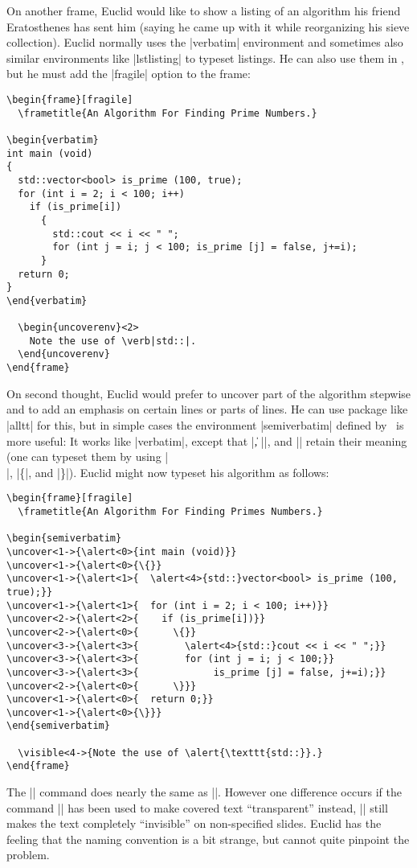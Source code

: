 On another frame, Euclid would like to show a listing of an algorithm his friend Eratosthenes has sent him (saying he came up with it while reorganizing his sieve collection). Euclid normally uses the |verbatim| environment and sometimes also similar environments like |lstlisting| to typeset listings. He can also use them in \beamer, but he must add the |fragile| option to the frame:
\begin{Verbatim}
\begin{frame}[fragile]
  \frametitle{An Algorithm For Finding Prime Numbers.}

\begin{verbatim}
int main (void)
{
  std::vector<bool> is_prime (100, true);
  for (int i = 2; i < 100; i++)
    if (is_prime[i])
      {
        std::cout << i << " ";
        for (int j = i; j < 100; is_prime [j] = false, j+=i);
      }
  return 0;
}
\end{verbatim}

  \begin{uncoverenv}<2>
    Note the use of \verb|std::|.
  \end{uncoverenv}
\end{frame}
\end{Verbatim}

On second thought, Euclid would prefer to uncover part of the algorithm stepwise and to add an emphasis on certain lines or parts of lines. He can use package like |alltt| for this, but in simple cases the environment |{semiverbatim}| defined by \beamer\ is more useful: It works like |{verbatim}|, except that |\|, |{|, and |}| retain their meaning (one can typeset them by using |\\|, |\{|, and |\}|). Euclid might now typeset his algorithm as follows:
\begin{Verbatim}
\begin{frame}[fragile]
  \frametitle{An Algorithm For Finding Primes Numbers.}

\begin{semiverbatim}
\uncover<1->{\alert<0>{int main (void)}}
\uncover<1->{\alert<0>{\{}}
\uncover<1->{\alert<1>{  \alert<4>{std::}vector<bool> is_prime (100, true);}}
\uncover<1->{\alert<1>{  for (int i = 2; i < 100; i++)}}
\uncover<2->{\alert<2>{    if (is_prime[i])}}
\uncover<2->{\alert<0>{      \{}}
\uncover<3->{\alert<3>{        \alert<4>{std::}cout << i << " ";}}
\uncover<3->{\alert<3>{        for (int j = i; j < 100;}}
\uncover<3->{\alert<3>{             is_prime [j] = false, j+=i);}}
\uncover<2->{\alert<0>{      \}}}
\uncover<1->{\alert<0>{  return 0;}}
\uncover<1->{\alert<0>{\}}}
\end{semiverbatim}

  \visible<4->{Note the use of \alert{\texttt{std::}}.}
\end{frame}
\end{Verbatim}
The |\visible| command does nearly the same as |\uncover|. However one difference occurs if the command || has been used to make covered text ``transparent'' instead, |\visible| still makes the text completely ``invisible'' on non-specified slides. Euclid has the feeling that the naming convention is a bit strange, but cannot quite pinpoint the problem.


